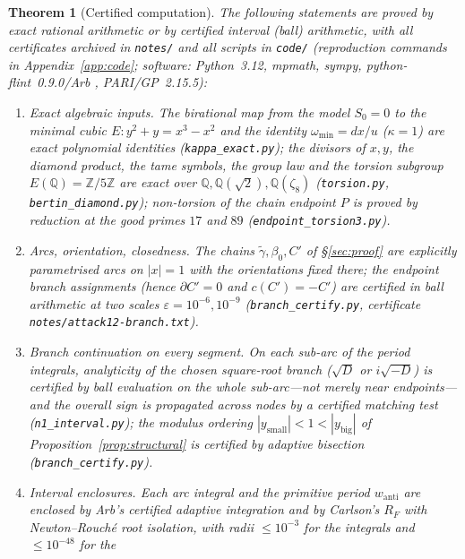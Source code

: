 \documentclass[11pt]{amsart}
\newtheorem{theorem}{Theorem}[section]
\theoremstyle{definition}
\theoremstyle{remark}
\newcommand{\Q}{\mathbb{Q}}
\newcommand{\Z}{\mathbb{Z}}
\begin{document}
\begin{theorem}[Certified computation]\label{thm:cert}
The following statements are proved by exact rational arithmetic or by
certified interval (ball) arithmetic, with all certificates archived in
\texttt{notes/} and all scripts in \texttt{code/}
\textup{(}reproduction commands in Appendix~\ref{app:code};
software: Python~3.12, mpmath, sympy, python-flint~0.9.0/Arb \cite{Arb},
PARI/GP~2.15.5\textup{)}:
\begin{enumerate}
  \item \emph{Exact algebraic inputs.} The birational map from the model
  $S_0=0$ to the minimal cubic $E:y^2+y=x^3-x^2$ and the identity
  $\omega_{\min}=dx/u$ \textup{(}$\kappa=1$\textup{)} are exact polynomial
  identities \textup{(}\texttt{kappa\_exact.py}\textup{)}; the divisors of
  $x,y$, the diamond product, the tame symbols, the group law and the
  torsion subgroup $E(\Q)=\Z/5\Z$ are exact over
  $\Q,\Q(\sqrt2),\Q(\zeta_8)$ \textup{(}\texttt{torsion.py},
  \texttt{bertin\_diamond.py}\textup{)}; non-torsion of the chain endpoint
  $P$ is proved by reduction at the good primes $17$ and $89$
  \textup{(}\texttt{endpoint\_torsion3.py}\textup{)}.
  \item \emph{Arcs, orientation, closedness.} The chains
  $\tilde\gamma,\beta_0,C'$ of \S\ref{sec:proof} are explicitly parametrised
  arcs on $|x|=1$ with the orientations fixed there; the endpoint branch
  assignments \textup{(}hence $\partial C'=0$ and
  $c(C')=-C'$\textup{)} are certified in ball arithmetic at two scales
  $\varepsilon=10^{-6},10^{-9}$ \textup{(}\texttt{branch\_certify.py},
  certificate \texttt{notes/attack12-branch.txt}\textup{)}.
  \item \emph{Branch continuation on every segment.} On each sub-arc of the
  period integrals, analyticity of the chosen square-root branch
  \textup{(}$\sqrt D$ or $i\sqrt{-D}$\textup{)} is certified by ball
  evaluation on the whole sub-arc---not merely near endpoints---and the
  overall sign is propagated across nodes by a certified matching test
  \textup{(}\texttt{n1\_interval.py}\textup{)}; the modulus ordering
  $|y_{\mathrm{small}}|<1<|y_{\mathrm{big}}|$ of
  Proposition~\ref{prop:structural} is certified by adaptive bisection
  \textup{(}\texttt{branch\_certify.py}\textup{)}.
  \item \emph{Interval enclosures.} Each arc integral and the primitive
  period $w_{\mathrm{anti}}$ are enclosed by Arb's certified adaptive
  integration and by Carlson's $R_F$ with Newton--Rouch\'e root isolation,
  with radii $\le10^{-3}$ for the integrals and $\le10^{-48}$ for the

\end{enumerate}
\end{theorem}
\end{document}
